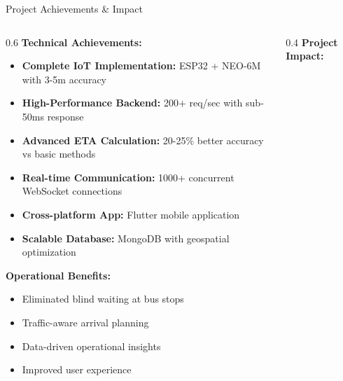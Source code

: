 \documentclass[aspectratio=169]{beamer}
\begin{document}
\begin{frame}{Project Achievements \& Impact}
    \begin{columns}
        \begin{column}{0.6\textwidth}
            \textbf{Technical Achievements:}
            \begin{itemize}
                \item \textbf{Complete IoT Implementation:} ESP32 + NEO-6M with 3-5m accuracy
                \item \textbf{High-Performance Backend:} 200+ req/sec with sub-50ms response
                \item \textbf{Advanced ETA Calculation:} 20-25\% better accuracy vs basic methods
                \item \textbf{Real-time Communication:} 1000+ concurrent WebSocket connections
                \item \textbf{Cross-platform App:} Flutter mobile application
                \item \textbf{Scalable Database:} MongoDB with geospatial optimization
            \end{itemize}
            
            \vspace{0.3cm}
            \textbf{Operational Benefits:}
            \begin{itemize}
                \item Eliminated blind waiting at bus stops
                \item Traffic-aware arrival planning
                \item Data-driven operational insights
                \item Improved user experience
            \end{itemize}
        \end{column}
        \begin{column}{0.4\textwidth}
            \textbf{Project Impact:}
\end{column}
\end{columns}
\end{frame}
\end{document}
